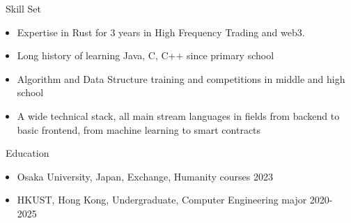 \documentclass{resume}
\begin{document}

\begin{rSection}{\faCogs~Skill Set}
    \begin{itemize}
        \itemsep -0.5em
        \item Expertise in Rust for 3 years in High Frequency Trading and web3.
        \item Long history of learning Java, C, C++ since primary school 
        \item Algorithm and Data Structure training and competitions in middle and high school
        \item A wide technical stack, all main stream languages in fields from backend to basic frontend, from machine learning to smart contracts 
    \end{itemize}
    
\end{rSection}

\begin{rSection}{\faGraduationCap~Education}
    \begin{itemize}
        \item Osaka University, Japan, Exchange, Humanity courses \hfill 2023 
        \item HKUST, Hong Kong, Undergraduate, Computer Engineering major \hfill 2020-2025
    \end{itemize}
\end{rSection}
\end{document}
